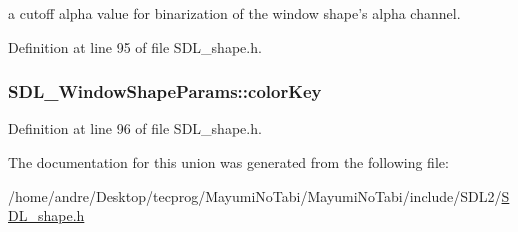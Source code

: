 a cutoff alpha value for binarization of the window shape's alpha channel. 



Definition at line 95 of file S\-D\-L\-\_\-shape.\-h.

\hypertarget{union_s_d_l___window_shape_params_a8bf3e442a51a1bbf452cfec7c1ed5318}{
\subsubsection[{color\-Key}]{ S\-D\-L\-\_\-\-Window\-Shape\-Params\-::color\-Key}}\label{union_s_d_l___window_shape_params_a8bf3e442a51a1bbf452cfec7c1ed5318}


Definition at line 96 of file S\-D\-L\-\_\-shape.\-h.



The documentation for this union was generated from the following file\-:\begin{DoxyCompactItemize}
\item 
/home/andre/\-Desktop/tecprog/\-Mayumi\-No\-Tabi/\-Mayumi\-No\-Tabi/include/\-S\-D\-L2/\hyperlink{_s_d_l__shape_8h}{S\-D\-L\-\_\-shape.\-h}\end{DoxyCompactItemize}
